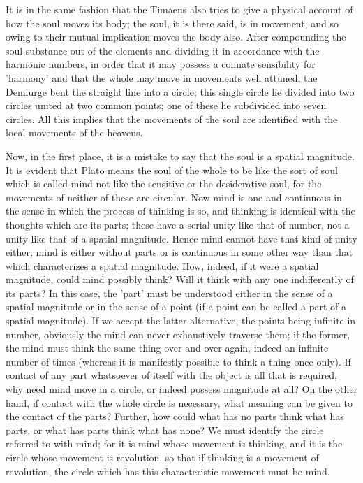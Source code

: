It is in the same fashion that the Timaeus also tries to give a physical
account of how the soul moves its body; the soul, it is there said,
is in movement, and so owing to their mutual implication moves the
body also. After compounding the soul-substance out of the elements
and dividing it in accordance with the harmonic numbers, in order
that it may possess a connate sensibility for 'harmony' and that the
whole may move in movements well attuned, the Demiurge bent the straight
line into a circle; this single circle he divided into two circles
united at two common points; one of these he subdivided into seven
circles. All this implies that the movements of the soul are identified
with the local movements of the heavens. 

Now, in the first place, it is a mistake to say that the soul is a
spatial magnitude. It is evident that Plato means the soul of the
whole to be like the sort of soul which is called mind not like the
sensitive or the desiderative soul, for the movements of neither of
these are circular. Now mind is one and continuous in the sense in
which the process of thinking is so, and thinking is identical with
the thoughts which are its parts; these have a serial unity like that
of number, not a unity like that of a spatial magnitude. Hence mind
cannot have that kind of unity either; mind is either without parts
or is continuous in some other way than that which characterizes a
spatial magnitude. How, indeed, if it were a spatial magnitude, could
mind possibly think? Will it think with any one indifferently of its
parts? In this case, the 'part' must be understood either in the sense
of a spatial magnitude or in the sense of a point (if a point can
be called a part of a spatial magnitude). If we accept the latter
alternative, the points being infinite in number, obviously the mind
can never exhaustively traverse them; if the former, the mind must
think the same thing over and over again, indeed an infinite number
of times (whereas it is manifestly possible to think a thing once
only). If contact of any part whatsoever of itself with the object
is all that is required, why need mind move in a circle, or indeed
possess magnitude at all? On the other hand, if contact with the whole
circle is necessary, what meaning can be given to the contact of the
parts? Further, how could what has no parts think what has parts,
or what has parts think what has none? We must identify the circle
referred to with mind; for it is mind whose movement is thinking,
and it is the circle whose movement is revolution, so that if thinking
is a movement of revolution, the circle which has this characteristic
movement must be mind. 

